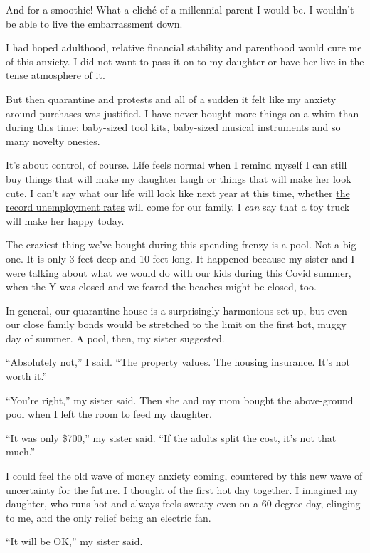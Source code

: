 And for a smoothie! What a cliché of a millennial parent I would be. I
wouldn't be able to live the embarrassment down.

I had hoped adulthood, relative financial stability and parenthood would
cure me of this anxiety. I did not want to pass it on to my daughter or
have her live in the tense atmosphere of it.

But then quarantine and protests and all of a sudden it felt like my
anxiety around purchases was justified. I have never bought more things
on a whim than during this time: baby-sized tool kits, baby-sized
musical instruments and so many novelty onesies.

It's about control, of course. Life feels normal when I remind myself I
can still buy things that will make my daughter laugh or things that
will make her look cute. I can't say what our life will look like next
year at this time, whether
\href{https://www.nytimes.com/2020/05/09/business/economy/coronavirus-unemployment.html}{the
record unemployment rates} will come for our family. I \emph{can} say
that a toy truck will make her happy today.

The craziest thing we've bought during this spending frenzy is a pool.
Not a big one. It is only 3 feet deep and 10 feet long. It happened
because my sister and I were talking about what we would do with our
kids during this Covid summer, when the Y was closed and we feared the
beaches might be closed, too.

In general, our quarantine house is a surprisingly harmonious set-up,
but even our close family bonds would be stretched to the limit on the
first hot, muggy day of summer. A pool, then, my sister suggested.

``Absolutely not,'' I said. ``The property values. The housing
insurance. It's not worth it.''

``You're right,'' my sister said. Then she and my mom bought the
above-ground pool when I left the room to feed my daughter.

``It was only \$700,'' my sister said. ``If the adults split the cost,
it's not that much.''

I could feel the old wave of money anxiety coming, countered by this new
wave of uncertainty for the future. I thought of the first hot day
together. I imagined my daughter, who runs hot and always feels sweaty
even on a 60-degree day, clinging to me, and the only relief being an
electric fan.

``It will be OK,'' my sister said.

